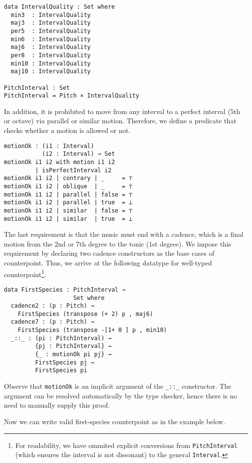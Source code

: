 \documentclass[sigplan,review]{acmart}\settopmatter{printfolios=true,printccs=false,printacmref=false}
\begin{document}
\begin{lstlisting}
data IntervalQuality : Set where
  min3  : IntervalQuality
  maj3  : IntervalQuality
  per5  : IntervalQuality
  min6  : IntervalQuality
  maj6  : IntervalQuality
  per8  : IntervalQuality
  min10 : IntervalQuality
  maj10 : IntervalQuality

PitchInterval : Set
PitchInterval = Pitch × IntervalQuality
\end{lstlisting}

In addition, it is prohibited to move from any interval to
a perfect interval (5th or octave) via parallel or similar motion.
Therefore, we define a predicate that checks whether a motion 
is allowed or not.

\begin{lstlisting}
motionOk : (i1 : Interval)
           (i2 : Interval) → Set
motionOk i1 i2 with motion i1 i2
         | isPerfectInterval i2
motionOk i1 i2 | contrary | _     = ⊤
motionOk i1 i2 | oblique  | _     = ⊤
motionOk i1 i2 | parallel | false = ⊤
motionOk i1 i2 | parallel | true  = ⊥
motionOk i1 i2 | similar  | false = ⊤
motionOk i1 i2 | similar  | true  = ⊥
\end{lstlisting}

The last requirement is that the music must end with a cadence,
 which is a final motion from the 2nd or 7th degree to the tonic 
(1st degree). 
We impose this requirement by declaring two cadence constructors 
as the base cases of counterpoint.
Thus, we arrive at the following datatype for well-typed counterpoint\footnote{
For readability, we have ommited explicit conversions 
from \texttt{PitchInterval} (which ensures the interval is not dissonant) 
to the general \texttt{Interval}.}.

\begin{lstlisting}
data FirstSpecies : PitchInterval →
                    Set where
  cadence2 : (p : Pitch) →
    FirstSpecies (transpose (+ 2) p , maj6)
  cadence7 : (p : Pitch) →
    FirstSpecies (transpose -[1+ 0 ] p , min10)
  _::_ : (pi : PitchInterval) →
         {pj : PitchInterval} →
         {_ : motionOk pi pj} →
         FirstSpecies pj →
         FirstSpecies pi
\end{lstlisting}

\noindent Observe that \texttt{motionOk} is an implicit argument of 
the \texttt{\_::\_} constructor. 
The argument can be resolved automatically by the type checker,
hence there is no need to manually supply this proof. 

Now we can write valid first-species counterpoint as in the 
example below.
\end{document}
